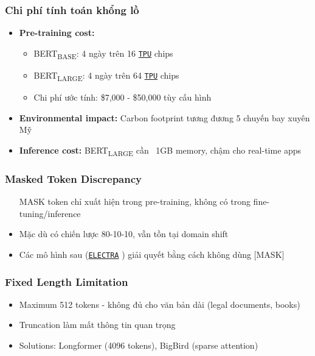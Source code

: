 \subsubsection{Chi phí tính toán khổng lồ}
\begin{itemize}
    \item \textbf{Pre-training cost:}
    \begin{itemize}
        \item BERT\textsubscript{BASE}: 4 ngày trên 16 \hyperref[acro:tpu]{\texttt{TPU}} chips \cite{devlin2018bert}
        \item BERT\textsubscript{LARGE}: 4 ngày trên 64 \hyperref[acro:tpu]{\texttt{TPU}} chips \cite{devlin2018bert}
        \item Chi phí ước tính: \$7,000 - \$50,000 tùy cấu hình
    \end{itemize}
    \item \textbf{Environmental impact:} Carbon footprint tương đương 5 chuyến bay xuyên Mỹ
    \item \textbf{Inference cost:} BERT\textsubscript{LARGE} cần ~1GB memory, chậm cho real-time apps
\end{itemize}

\subsubsection{Masked Token Discrepancy}
\begin{itemize}
    \item [MASK] token chỉ xuất hiện trong pre-training, không có trong fine-tuning/inference
    \item Mặc dù có chiến lược 80-10-10, vẫn tồn tại domain shift
    \item Các mô hình sau (\hyperref[acro:electra]{\texttt{ELECTRA}} \cite{clark2020electra}) giải quyết bằng cách không dùng [MASK]
\end{itemize}

\subsubsection{Fixed Length Limitation}
\begin{itemize}
    \item Maximum 512 tokens - không đủ cho văn bản dài (legal documents, books)
    \item Truncation làm mất thông tin quan trọng
    \item Solutions: Longformer \cite{beltagy2020longformer} (4096 tokens), BigBird (sparse attention)
\end{itemize}

